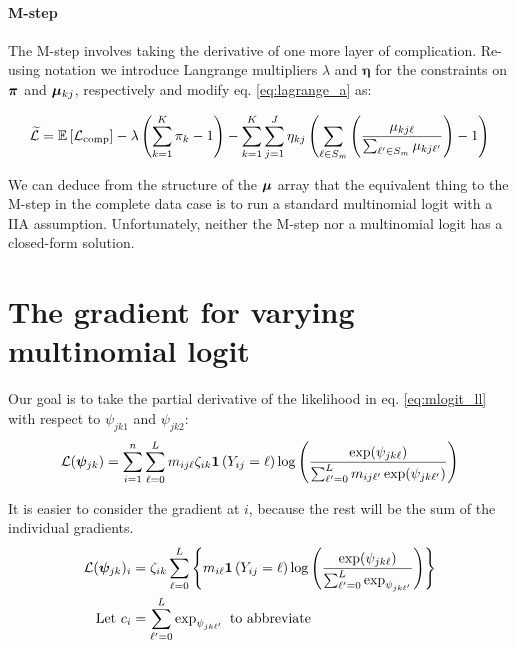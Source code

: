 \documentclass[11pt]{article}
\begin{document}
\begin{appendices}
\paragraph{M-step}  The M-step involves taking the derivative of one more layer of complication. Re-using notation we introduce Langrange multipliers \(\lambda\) and \(\bm{\eta}\) for the constraints on \(\bm{\pi}\) and \(\bm{\mu}_{kj}\), respectively and modify eq. \ref{eq:lagrange_a} as:

\begin{align}
\widetilde{\mathcal{L}} = \mathbb{E}\left[\mathcal{L}_\text{comp}\right] - \lambda\left(\sum^{K}_{k=1}\pi_k - 1\right) - \sum^{K}_{k=1}\sum^{J}_{j=1}\eta_{kj}\left(\sum_{\ell \in S_{m}}\left(\frac{\mu_{kj\ell}}{\sum_{\ell^\prime \in S_{m}} \mu_{kj\ell^\prime}}\right) - 1\right) \nonumber
\end{align}

We can deduce from the structure of the \(\bm{\mu}\) array that the equivalent thing to the M-step in the complete data case is to run a standard multinomial logit with a IIA assumption. Unfortunately, neither the M-step nor a multinomial logit has a closed-form solution.


\section{The gradient for varying multinomial logit }
\label{sec:vcmlogit_derivation}

Our goal is to take the partial derivative of the likelihood in eq. \ref{eq:mlogit_ll} with respect to \(\psi_{jk1}\) and \(\psi_{jk2}\):
\begin{align}
\mathcal{L}(\bm{\psi}_{jk}) = \sum^n_{i=1}\sum^{L}_{\ell = 0} m_{ij\ell}\zeta_{ik} \bm{1}\left(Y_{ij} = \ell\right) \log\left(\frac{\exp(\psi_{jk\ell})}{\sum_{\ell^\prime = 0}^{L} m_{ij\ell^\prime} \exp(\psi_{jk\ell^\prime})} \right)
\end{align}

It is easier to consider the gradient at \(i\), because the rest will be the sum of the individual gradients.
\begin{align*}
\mathcal{L}(\bm{\psi}_{jk})_i &= \zeta_{ik}\sum^L_{\ell = 0}\left\{m_{i\ell}\bm{1}\left(Y_{ij} = \ell\right)\log\left(\frac{\exp(\psi_{jk\ell})}{\sum^L_{\ell^\prime = 0}\exp_{\psi_{jk\ell^\prime}}}\right)\right\}\\
\text{Let } c_i &= \sum^L_{\ell^\prime = 0}\exp_{\psi_{jk\ell^\prime}} \text{ to abbreviate}\end{align*}


\end{appendices}
\end{document}
